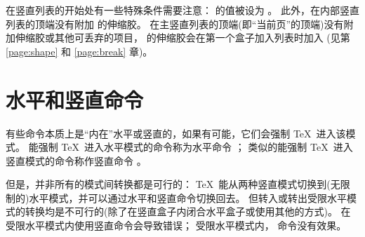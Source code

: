 \documentclass{book}
\begin{document}
在竖直列表的开始处有一些特殊条件需要注意：
 的值被设为 \n{-1000pt}。
此外，在内部竖直列表的顶端没有附加  的伸缩胶。
在主竖直列表的顶端(即“当前页”的顶端)没有附加伸缩胶或其他可丢弃的项目，
 的伸缩胶会在第一个盒子加入列表时加入
(见第 \ref{page:shape} 和 \ref{page:break} 章)。

\section{水平和竖直命令}

有些命令本质上是“内在”水平或竖直的，如果有可能，它们会强制 \TeX\ 进入该模式。
能强制 \TeX\ 进入水平模式的命令称为水平命令 ；
类似的能强制 \TeX\ 进入竖直模式的命令称作竖直命令 。

但是，并非所有的模式间转换都是可行的：
\TeX\ 能从两种竖直模式切换到(无限制的)水平模式，并可以通过水平和竖直命令切换回去。
但转入或转出受限水平模式的转换均是不可行的(除了在竖直盒子内闭合水平盒子或使用其他的方式)。
在受限水平模式内使用竖直命令会导致错误；
受限水平模式内， 命令没有效果。
\end{document}
